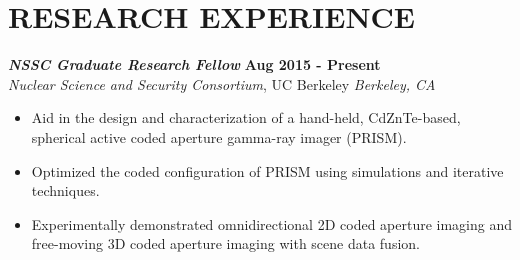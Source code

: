 \section{\small{RESEARCH EXPERIENCE}}

{\sl\bf NSSC Graduate Research Fellow} \hfill {\bf Aug 2015 - Present} \\
{\sl Nuclear Science and Security Consortium}, UC Berkeley \hfill {\sl Berkeley, CA} \\[-2.8ex]
\vspace{2pt}
\begin{itemize}[leftmargin=4ex] \itemsep -2pt
\item Aid in the design and characterization of a hand-held, CdZnTe-based, spherical active coded aperture gamma-ray imager (PRISM).
\item Optimized the coded configuration of PRISM using simulations and iterative techniques.
\item Experimentally demonstrated omnidirectional 2D coded aperture imaging and free-moving 3D coded aperture imaging with scene data fusion.
\end{itemize} 

